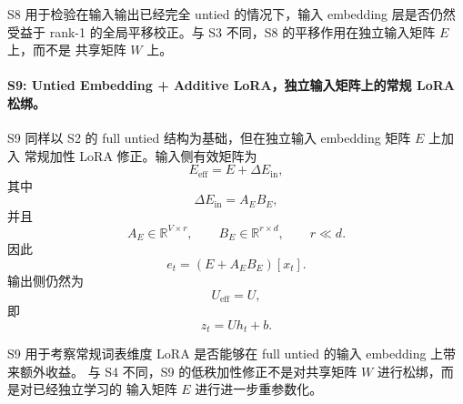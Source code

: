 S8 用于检验在输入输出已经完全 untied 的情况下，输入 embedding 层是否仍然受益于
rank-1 的全局平移校正。与 S3 不同，S8 的平移作用在独立输入矩阵 $E$ 上，而不是
共享矩阵 $W$ 上。

\paragraph{S9: Untied Embedding + Additive LoRA，独立输入矩阵上的常规 LoRA 松绑。}
S9 同样以 S2 的 full untied 结构为基础，但在独立输入 embedding 矩阵 $E$ 上加入
常规加性 LoRA 修正。输入侧有效矩阵为
\begin{equation}
    E_{\mathrm{eff}} = E + \Delta E_{\mathrm{in}},
\end{equation}
其中
\begin{equation}
    \Delta E_{\mathrm{in}} = A_{E}B_{E},
\end{equation}
并且
\begin{equation}
    A_{E} \in \mathbb{R}^{V \times r}, \qquad
    B_{E} \in \mathbb{R}^{r \times d}, \qquad
    r \ll d.
\end{equation}
因此
\begin{equation}
    e_t = \left(E + A_EB_E\right)[x_t].
\end{equation}
输出侧仍然为
\begin{equation}
    U_{\mathrm{eff}} = U,
\end{equation}
即
\begin{equation}
    z_t = U h_t + b.
\end{equation}

S9 用于考察常规词表维度 LoRA 是否能够在 full untied 的输入 embedding 上带来额外收益。
与 S4 不同，S9 的低秩加性修正不是对共享矩阵 $W$ 进行松绑，而是对已经独立学习的
输入矩阵 $E$ 进行进一步重参数化。

